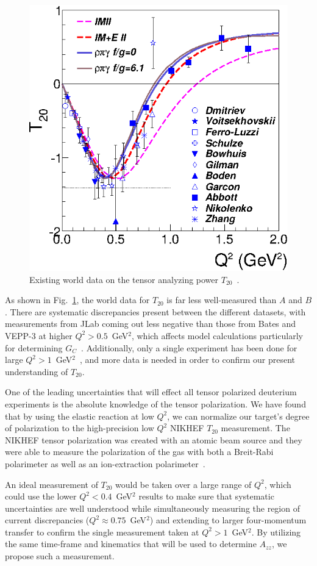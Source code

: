 \begin{figure}
\begin{center}
\includegraphics{figs/t20_data.eps} 
\caption{\label{t20-world}Existing world data on the tensor analyzing power $T_{20}$~\cite{Holt:2012gg}.}
\end{center}
\end{figure}

As shown in Fig.~\ref{t20-world}, the world data for $T_{20}$ is far less well-measured than $A$ and $B$. There are systematic discrepancies present between the different datasets, with measurements from JLab coming out less negative than those from Bates and VEPP-3 at higher $Q^2>0.5$~GeV$^2$, which affects model calculations particularly for determining $G_C$~\cite{Gilman:2001yh}.  Additionally, only a single experiment has been done for large $Q^2>1$~GeV$^2$~\cite{Abbott:2000fg}, and more data is needed in order to confirm our present understanding of $T_{20}$.

One of the leading uncertainties that will effect all tensor polarized deuterium experiments is the absolute knowledge of the tensor polarization.   We have found that by using the elastic reaction at low $Q^2$, we can normalize our target's degree of polarization to the high-precision low $Q^2$ NIKHEF $T_{20}$ measurement.  The NIKHEF tensor polarization was created with an atomic beam source and they were able to measure the polarization of the gas with both a Breit-Rabi polarimeter as well as an ion-extraction polarimeter~\cite{Bouwhuis:1998re}. 

An ideal measurement of $T_{20}$ would be taken over a large range of $Q^2$, which could use the lower $Q^2<0.4$~GeV$^2$ results to make sure that systematic uncertainties are well understood while simultaneously measuring the region of current discrepancies ($Q^2\approx0.75$~GeV$^2$) and extending to larger four-momentum transfer to confirm the single measurement taken at $Q^2>1$~GeV$^2$. By utilizing the same time-frame and kinematics that will be used to determine $A_{zz}$, we propose such a measurement.